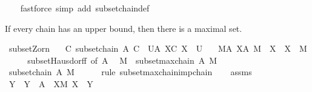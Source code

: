 \begin{isabellebody}
%
\isadelimproof
\ \ %
\endisadelimproof
%
\isatagproof
{}\isamarkupfalse%
\ {\isacharparenleft}{\kern0pt}fastforce\ simp\ add{\isacharcolon}{\kern0pt}\ subset{\isacharunderscore}{\kern0pt}chain{\isacharunderscore}{\kern0pt}def{\isacharparenright}{\kern0pt}%
\endisatagproof
{\isafoldproof}%
%
\isadelimproof
%
\endisadelimproof
%
\isadelimdocument
%
\endisadelimdocument
%
\isatagdocument
%
\isamarkuptrue%
%
\endisatagdocument
{\isafolddocument}%
%
\isadelimdocument
%
\endisadelimdocument
%
\begin{isamarkuptext}%
If every chain has an upper bound, then there is a maximal set.%
\end{isamarkuptext}\isamarkuptrue%
\isamarkupfalse%
\ subset{\isacharunderscore}{\kern0pt}Zorn{\isacharcolon}{\kern0pt}\isanewline
\ \ \ {\isachardoublequoteopen}{\isasymAnd}C{\isachardot}{\kern0pt}\ subset{\isachardot}{\kern0pt}chain\ A\ C\ {\isasymLongrightarrow}\ {\isasymexists}U{\isasymin}A{\isachardot}{\kern0pt}\ {\isasymforall}X{\isasymin}C{\isachardot}{\kern0pt}\ X\ {\isasymsubseteq}\ U{\isachardoublequoteclose}\isanewline
\ \ \ {\isachardoublequoteopen}{\isasymexists}M{\isasymin}A{\isachardot}{\kern0pt}\ {\isasymforall}X{\isasymin}A{\isachardot}{\kern0pt}\ M\ {\isasymsubseteq}\ X\ {\isasymlongrightarrow}\ X\ {\isacharequal}{\kern0pt}\ M{\isachardoublequoteclose}\isanewline
%
\isadelimproof
%
\endisadelimproof
%
\isatagproof
{}\isamarkupfalse%
\ {\isacharminus}{\kern0pt}\isanewline
\ \ \isamarkupfalse%
\ subset{\isachardot}{\kern0pt}Hausdorff\ {\isacharbrackleft}{\kern0pt}of\ A{\isacharbrackright}{\kern0pt}\ \isamarkupfalse%
\ M\ \ {\isachardoublequoteopen}subset{\isachardot}{\kern0pt}maxchain\ A\ M{\isachardoublequoteclose}\ \isacommand{{\isachardot}{\kern0pt}{\isachardot}{\kern0pt}}\isamarkupfalse%
\isanewline
\ \ \isamarkupfalse%
\ \isamarkupfalse%
\ {\isachardoublequoteopen}subset{\isachardot}{\kern0pt}chain\ A\ M{\isachardoublequoteclose}\isanewline
\ \ \ \ \isamarkupfalse%
\ {\isacharparenleft}{\kern0pt}rule\ subset{\isachardot}{\kern0pt}maxchain{\isacharunderscore}{\kern0pt}imp{\isacharunderscore}{\kern0pt}chain{\isacharparenright}{\kern0pt}\isanewline
\ \ \isamarkupfalse%
\ assms\ \isamarkupfalse%
\ Y\ \ {\isachardoublequoteopen}Y\ {\isasymin}\ A{\isachardoublequoteclose}\ \ {\isachardoublequoteopen}{\isasymforall}X{\isasymin}M{\isachardot}{\kern0pt}\ X\ {\isasymsubseteq}\ Y{\isachardoublequoteclose}\isanewline

\end{isabellebody}
